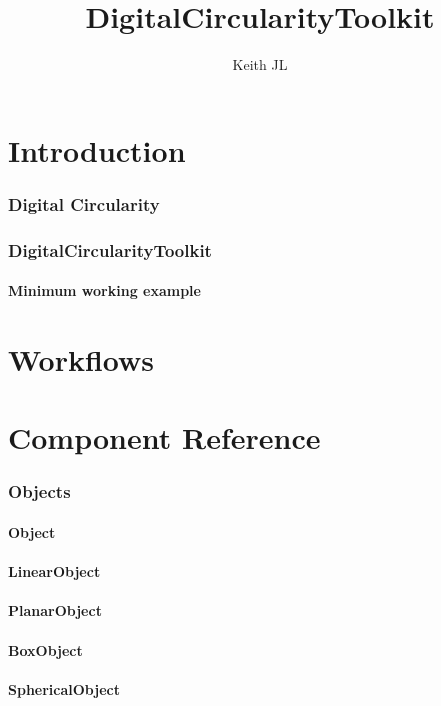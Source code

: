\documentclass{ol-softwaremanual}
\title{DigitalCircularityToolkit}
\author{Keith JL}
\begin{document}
\maketitle


\tableofcontents
\newpage
\part{Introduction}
\section{Digital Circularity}

\section{DigitalCircularityToolkit}
\subsection{Minimum working example}

\part{Workflows}

\part{Component Reference}
\section{Objects}
\subsection{Object}

\subsection{LinearObject}

\subsection{PlanarObject}

\subsection{BoxObject}

\subsection{SphericalObject}
\end{document}

